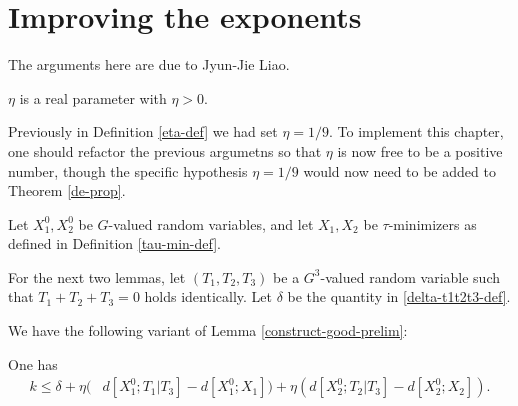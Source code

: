 \chapter{Improving the exponents}

The arguments here are due to Jyun-Jie Liao.

\begin{definition}\label{eta-def-new}\leanok  $\eta$ is a real parameter with $\eta > 0$.
\end{definition}

Previously in Definition \ref{eta-def} we had set $\eta=1/9$.  To implement this chapter, one should refactor the previous argumetns so that $\eta$ is now free to be a positive number, though the specific hypothesis $\eta=1/9$ would now need to be added to Theorem \ref{de-prop}.

Let $X^0_1, X^0_2$ be $G$-valued random variables, and let $X_1, X_2$ be $\tau$-minimizers as defined in Definition \ref{tau-min-def}.

For the next two lemmas, let $(T_1,T_2,T_3)$ be a $G^3$-valued random variable such that $T_1+T_2+T_3=0$ holds identically. Let $\delta$ be the quantity in \eqref{delta-t1t2t3-def}.

We have the following variant of Lemma \ref{construct-good-prelim}:

\begin{lemma}\label{construct-good-prelim-improv}\leanok
  One has
  \begin{align*}  k \leq
    \delta + \eta (& d[X^0_1;T_1|T_3]-d[X^0_1;X_1])
      + \eta (d[X^0_2;T_2|T_3]-d[X^0_2;X_2]).
  \end{align*}
\end{lemma}

